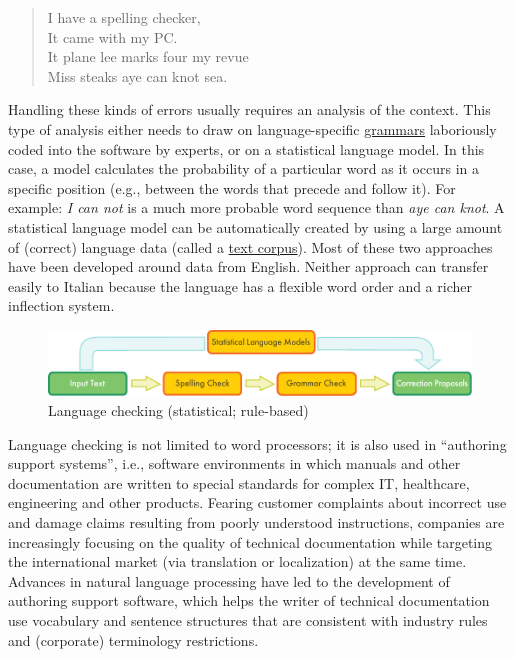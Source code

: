 \documentclass[]{../../metanetpaper}
\begin{document}
\begin{multicols}{2}
\begin{quote}
  I have a spelling checker,\\
  It came with my PC.\\
  It plane lee marks four my revue\\
  Miss steaks aye can knot sea.
\end{quote}
 


Handling these kinds of errors usually requires an analysis of the context.
This type of analysis either needs to draw on language-specific
\underline{grammars} laboriously coded into the software by experts, or on a
statistical language model. In this case, a model calculates the probability
of a particular word as it occurs in a specific position (e.g., between the
words that precede and follow it). For example: \emph{I can not} is a much more probable word sequence than \emph{aye can knot}. A statistical language model can be automatically created by using a large amount of (correct) language data (called a \underline{text corpus}). Most of these two approaches have been developed around data from English. Neither approach can transfer easily to Italian because the language has a flexible word order and a richer inflection system. 


\begin{figure}[htb]
  \center
  \includegraphics[width=\textwidth]{../_media/english/language_checking}
  \caption{Language checking (statistical; rule-based)}
  \label{fig:langcheckingaarch_en}
\end{figure}

Language checking is not limited to word processors; it is also used in
“authoring support systems”, i.e., software environments in which
manuals and other documentation are written to special standards for complex
IT, healthcare, engineering and other products. Fearing customer complaints
about incorrect use and damage claims resulting from poorly understood
instructions, companies are increasingly focusing on the quality of technical
documentation while targeting the international market (via translation or
localization) at the same time. Advances in natural language processing have
led to the development of authoring support software, which helps the writer
of technical documentation use vocabulary and sentence structures that are
consistent with industry rules and (corporate) terminology restrictions.



\end{multicols}
\end{document}
